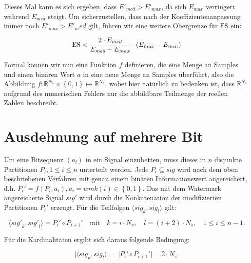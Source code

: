 Dieses Mal kann es sich ergeben, dass ${E'}_{med} > {E'}_{max}$, da sich ${E}_{max}$ verringert während ${E}_{med}$ steigt. Um sicherzustellen, dass nach der Koeffizientenanpassung immer noch ${E'}_{max} > {E'}_med$ gilt, führen wir eine weitere Obergrenze für $\mbox{ES}$ ein:

	\begin{equation}
		\mbox{ES} < { 2 \cdot {E}_{med} \over {E}_{med} + {E}_{max} } \cdot ( {E}_{max} - {E}_{min} )
		\label{equ:embeddingstrengthconstraint_case2}
	\end{equation}

Formal können wir nun eine Funktion $f$ definieren, die eine Menge an Samples und einen binären Wert $a$ in eine neue Menge an Samples überführt, also die Abbildung $f: {\mathbb{R}}^{{N}_{s}} \times \left\{0,1\right\} \mapsto  {\mathbb{R}}^{{N}_{s}}$, wobei hier natürlich zu bedenken ist, dass ${\mathbb{R}}^{{N}_{s}}$ aufgrund des numerischen Fehlers nur die abbildbare Teilmenge der reellen Zahlen beschreibt. 

\section{Ausdehnung auf mehrere Bit}
\label{sec:embeddingstragety_bitsequence}

Um eine Bitsequenz $({a}_{i})$ in ein Signal einzubetten, muss dieses in $n$ disjunkte Partitionen ${P}_{i}, {1}\leq{i}\leq{n}$ unterteilt werden. Jede ${P}_{i}\subseteq{sig}$ wird nach dem oben beschriebenen Verfahren mit genau einem binären Informationswert angereichert, d.h. ${P}_{i}'=f({P}_{i}, {a}_{i}), {a}_{i} = wmk(i)\in\left\{0,1\right\}$. Das mit dem Watermark angereicherte Signal $sig'$ wird durch die Konkatenation der modifizierten Partitionen ${P}_{i}'$ erzeugt. Für die Teilfolgen $\langle{sig}_{k},{sig}_{l}\rangle$ gilt:

	\begin{equation}
		\langle{sig'}_{k},{sig'}_{l}\rangle = {P}_{i}'\circ{P}_{i+1}' \quad\mbox{mit}\quad k=i \cdot {N}_{s},\quad l=(i+2) \cdot {N}_{s},\quad {1}\leq{i}\leq{n-1}.
		\label{equ:signalconcat}
	\end{equation}

Für die Kardinalitäten ergibt sich daraus folgende Bedingung:

	\begin{equation}
 	   \vert\langle{sig}_{k},{sig}_{l}\rangle\vert = \vert{P}_{i}'\circ{P}_{i+1}'\vert = 2 \cdot {N}_{s}.
	   \label{equ:signalcardinality}
	\end{equation}

